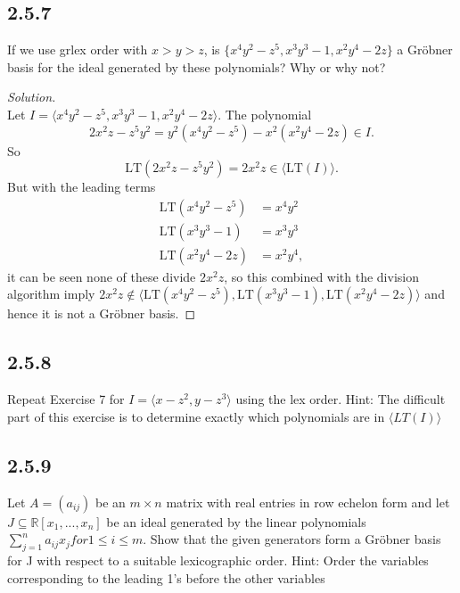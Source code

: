 \documentclass[]{article}
\newcommand\<{\langle}
\renewcommand\>{\rangle}
\newcommand{\RR}{\ensuremath{\mathbb{R}}}
\newenvironment{solution}
{
	\begin{proof}[Solution] \text{ }
		\\
	}
	{
	\end{proof}
}
\begin{document}
\subsection*{2.5.7} If we use grlex order with $x > y > z$, is $\{x^4y^2-z^5,x^3y^3-1,x^2y^4-2z\}$ a Gröbner basis for the ideal generated by these polynomials? Why or why not?
\begin{solution}
	Let $I = \<x^4y^2-z^5,x^3y^3-1,x^2y^4-2z\>$. The polynomial
	$$
		2x^2z - z^5y^2 = y^2\left(x^4y^2 - z^5\right) - x^2\left(x^2y^4 - 2z\right) \in I.
	$$
	So
	$$
		\text{LT}(2x^2z - z^5y^2) = 2x^2z \in \<\text{LT}(I)\>.
	$$
	But with the leading terms
	\begin{align*}
		\text{LT}(x^4y^2-z^5) &= x^4y^2 \\
		\text{LT}(x^3y^3-1) &= x^3y^3 \\
		\text{LT}(x^2y^4-2z) &= x^2y^4,
	\end{align*}
	it can be seen none of these divide $2x^2z$, so this combined with the division algorithm imply $2x^2z \notin \<\text{LT}(x^4y^2-z^5), \text{LT}(x^3y^3-1), \text{LT}(x^2y^4-2z)\>$ and hence it is not a Gröbner basis.
\end{solution}

\subsection*{2.5.8} Repeat Exercise 7 for $I = \<x - z^2, y - z^3\>$ using the lex order. Hint: The difficult part of this exercise is to determine exactly which polynomials are in $\<LT(I)\>$

\subsection*{2.5.9} Let $A = (a_{ij})$ be an $m \times n$ matrix with real entries in row echelon form and let $J \subseteq \RR[x_1 , . . . , x_n ]$ be an ideal generated by the linear polynomials $\sum_{j=1}^{n}  a_{ij} x_j for 1 \leq i \leq m$.
Show that the given generators form a Gröbner basis for J with respect to a suitable
lexicographic order. Hint: Order the variables corresponding to the leading 1’s before
the other variables
\end{document}
